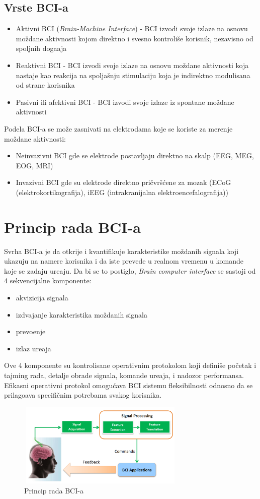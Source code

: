 \documentclass[conference]{IEEEtran}
\begin{document}
\subsection{Vrste BCI-a}
\begin{itemize}
    \item Aktivni BCI (\textit{Brain-Machine Interface}) - BCI izvodi svoje izlaze na osnovu moždane aktivnosti kojom direktno i svesno kontroliše korisnik, nezavisno od spoljnih doga\dj aja
    \item Reaktivni BCI - BCI izvodi svoje izlaze na osnovu moždane aktivnosti koja nastaje kao reakcija na spoljašnju stimulaciju koja je indirektno modulisana od strane korisnika 
    \item Pasivni ili afektivni BCI - BCI izvodi svoje izlaze iz spontane moždane aktivnosti 
\end{itemize}
Podela BCI-a se može zasnivati na elektrodama koje se koriste za merenje moždane aktivnosti:
\begin{itemize}
    \item Neinvazivni BCI gde se elektrode postavljaju direktno na skalp (EEG, MEG, EOG, MRI)
    \item Invazivni BCI gde su elektrode direktno pričvršćene za mozak (ECoG (elektrokortikografija), iEEG (intrakranijalna elektroencefalografija))
\end{itemize}
\section{Princip rada BCI-a}
Svrha BCI-a je da otkrije i kvantifikuje karakteristike moždanih signala koji ukazuju na namere korisnika i da iste prevede u realnom vremenu u komande koje se zadaju ure\dj aju. Da bi se to postiglo, \textit{Brain computer interface} se sastoji od 4 sekvencijalne komponente:
\begin{itemize}
    \item akvizicija signala
    \item izdvajanje karakteristika moždanih signala
    \item prevo\dj enje
    \item izlaz ure\dj aja
\end{itemize}
Ove 4 komponente su kontrolisane operativnim protokolom koji definiše početak i tajming rada, detalje obrade signala, komande ure\dj aja, i nadozor performansa. Efikasni operativni protokol omogućava BCI sistemu fleksibilnosti odnosno da se prilago\dj ava specifičnim potrebama svakog korisnika.
\begin{figure}[htp]
\centerline{\includegraphics[width=8cm, height=4cm]{BCI-functions.png}}
\caption{Princip rada BCI-a}
\label{Slika}
\end{figure}
\end{document}

